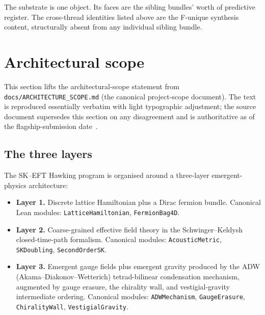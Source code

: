 \documentclass[aps,prd,reprint,nofootinbib,superscriptaddress]{revtex4-2}
\begin{document}
The substrate is one object. Its faces are the sibling bundles'
worth of predictive register. The cross-thread identities listed above
are the F-unique synthesis content, structurally absent from any
individual sibling bundle.


\section{Architectural scope}
\label{sec:architectural-scope}

This section lifts the architectural-scope statement from
\texttt{docs/ARCHITECTURE\_SCOPE.md} (the canonical project-scope
document). The text is reproduced essentially verbatim with light
typographic adjustment; the source document supersedes this section
on any disagreement and is authoritative as of the flagship-submission
date~\cite{Roehm2026Strategy}.

\subsection{The three layers}

The SK--EFT Hawking program is organised around a three-layer
emergent-physics architecture:

\begin{itemize}
\item \textbf{Layer 1.} Discrete lattice Hamiltonian plus a Dirac
  fermion bundle. Canonical Lean modules:
  \texttt{LatticeHamiltonian}, \texttt{FermionBag4D}.
\item \textbf{Layer 2.} Coarse-grained effective field theory in the
  Schwinger--Keldysh closed-time-path formalism. Canonical modules:
  \texttt{AcousticMetric}, \texttt{SKDoubling},
  \texttt{SecondOrderSK}.
\item \textbf{Layer 3.} Emergent gauge fields plus emergent gravity
  produced by the ADW (Akama--Diakonov--Wetterich) tetrad-bilinear
  condensation mechanism, augmented by gauge erasure, the chirality
  wall, and vestigial-gravity intermediate ordering. Canonical modules:
  \texttt{ADWMechanism}, \texttt{GaugeErasure}, \texttt{ChiralityWall},
  \texttt{VestigialGravity}.
\end{itemize}
\end{document}
